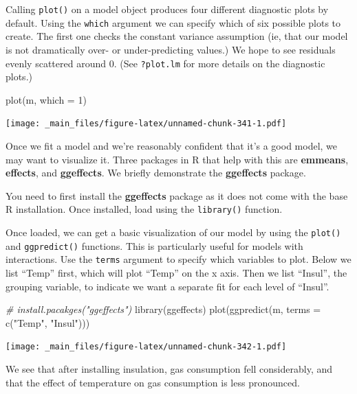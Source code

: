 \documentclass[
]{book}
\newenvironment{Shaded}{\begin{snugshade}}{\end{snugshade}}
\newcommand{\AttributeTok}[1]{\textcolor[rgb]{0.77,0.63,0.00}{#1}}
\newcommand{\CommentTok}[1]{\textcolor[rgb]{0.56,0.35,0.01}{\textit{#1}}}
\newcommand{\DecValTok}[1]{\textcolor[rgb]{0.00,0.00,0.81}{#1}}
\newcommand{\FunctionTok}[1]{\textcolor[rgb]{0.00,0.00,0.00}{#1}}
\newcommand{\NormalTok}[1]{#1}
\newcommand{\StringTok}[1]{\textcolor[rgb]{0.31,0.60,0.02}{#1}}
\begin{document}
Calling \texttt{plot()} on a model object produces four different diagnostic plots by default. Using the \texttt{which} argument we can specify which of six possible plots to create. The first one checks the constant variance assumption (ie, that our model is not dramatically over- or under-predicting values.) We hope to see residuals evenly scattered around 0. (See \texttt{?plot.lm} for more details on the diagnostic plots.)

\begin{Shaded}
\begin{Highlighting}[]
\FunctionTok{plot}\NormalTok{(m, }\AttributeTok{which =} \DecValTok{1}\NormalTok{)}
\end{Highlighting}
\end{Shaded}

\texttt{[image: \_main\_files/figure-latex/unnamed-chunk-341-1.pdf]}

Once we fit a model and we're reasonably confident that it's a good model, we may want to visualize it. Three packages in R that help with this are \textbf{emmeans}, \textbf{effects}, and \textbf{ggeffects}. We briefly demonstrate the \textbf{ggeffects} package.

You need to first install the \textbf{ggeffects} package as it does not come with the base R installation. Once installed, load using the \texttt{library()} function.

Once loaded, we can get a basic visualization of our model by using the \texttt{plot()} and \texttt{ggpredict()} functions. This is particularly useful for models with interactions. Use the \texttt{terms} argument to specify which variables to plot. Below we list ``Temp'' first, which will plot ``Temp'' on the x axis. Then we list ``Insul'', the grouping variable, to indicate we want a separate fit for each level of ``Insul''.

\begin{Shaded}
\begin{Highlighting}[]
\CommentTok{\# install.pacakges("ggeffects")}
\FunctionTok{library}\NormalTok{(ggeffects)}
\FunctionTok{plot}\NormalTok{(}\FunctionTok{ggpredict}\NormalTok{(m, }\AttributeTok{terms =} \FunctionTok{c}\NormalTok{(}\StringTok{"Temp"}\NormalTok{, }\StringTok{"Insul"}\NormalTok{)))}
\end{Highlighting}
\end{Shaded}

\texttt{[image: \_main\_files/figure-latex/unnamed-chunk-342-1.pdf]}

We see that after installing insulation, gas consumption fell considerably, and that the effect of temperature on gas consumption is less pronounced.
\end{document}
